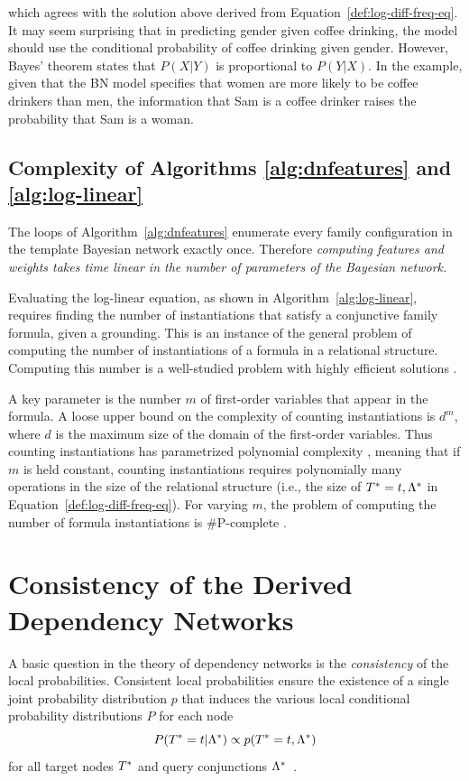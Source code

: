 \documentclass{sfuthesis}
\renewcommand{\Qconj}{\Appendterm{\FG{\TT} = \TV} {\QC}} %
\begin{document}
\noindent which agrees with the solution above derived from Equation~\eqref{def:log-diff-freq-eq}. It may seem surprising that in predicting gender given coffee drinking, the model should use the conditional probability of coffee drinking given gender. However, Bayes' theorem states that $P(X|Y)$ is proportional to $P(Y|X)$. In the example, given that the BN model specifies that women are more likely to be coffee drinkers than men, the information that Sam is a coffee drinker raises the probability that Sam is a woman. 

\subsection{Complexity of Algorithms \ref{alg:dnfeatures} and \ref{alg:log-linear}} \label{sec:complexity}
The loops of Algorithm~\ref{alg:dnfeatures} enumerate every family configuration in the template Bayesian network exactly once. Therefore {\em computing features and weights takes time linear in the number of parameters of the Bayesian network.} 

Evaluating the log-linear equation, as shown in Algorithm~\ref{alg:log-linear}, requires finding the number of instantiations that satisfy a conjunctive family formula, given a grounding. This is an instance of the general problem of computing the number of instantiations of a formula in a relational structure. Computing this number is a well-studied problem  with highly efficient solutions \cite{Vardi1995,Schulte2014}. 

A key parameter is the number $m$ of first-order variables that appear in the formula. A loose upper bound on the complexity of counting instantiations is $d^{m}$, where $d$ is the maximum size of the domain of the first-order variables. Thus counting instantiations has parametrized polynomial complexity \cite{Flum2006}, meaning that if $m$ is held constant, counting instantiations requires polynomially many operations in the size of the relational structure (i.e., the size of $\Qconj$ in Equation~\eqref{def:log-diff-freq-eq}). For varying $m$, the problem of computing the number of formula instantiations is \#P-complete \cite[Prop.12.4]{Domingos2007}.


 

\section{Consistency of the Derived Dependency Networks} \label{sec:consistency} A basic question in the theory of dependency networks is the {\em consistency} of the local probabilities.  Consistent local probabilities ensure the existence of a single joint probability distribution $p$ that induces the various local conditional probability distributions $P$ for each node
$$P(T^{*}\hspace{0.0ex} = t | \Lambda^{*}\hspace{0.0ex}) \propto p(T^{*}\hspace{0.0ex} =t,\Lambda^{*}\hspace{0.0ex})$$  
for all target nodes $T^{*}\hspace{0.0ex}$ and query conjunctions $\Lambda^{*}\hspace{0.0ex}$~\cite{Heckerman2000}.
\end{document}
